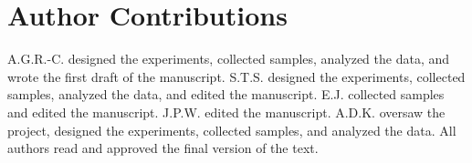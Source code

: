 \section*{Author Contributions}

A.G.R.-C. designed the experiments, collected samples, analyzed the data, and wrote the
first draft of the manuscript.
S.T.S. designed the experiments, collected samples, analyzed the data, and edited the
manuscript.
E.J. collected samples and edited the manuscript.
J.P.W. edited the manuscript.
A.D.K. oversaw the project, designed the experiments, collected samples, and analyzed the
data.
All authors read and approved the final version of the text.
